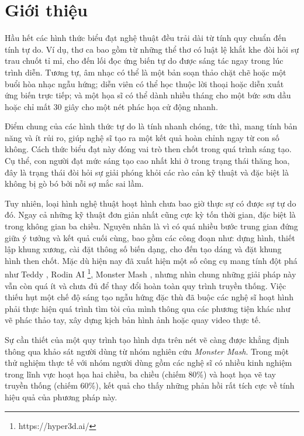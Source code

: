 \documentclass{report}
\begin{document}
\chapter{Giới thiệu}
Hầu hết các hình thức biểu đạt nghệ thuật đều trải dài từ tính quy chuẩn đến tính tự do. Ví dụ, thơ ca bao gồm từ những thể thơ có luật lệ khắt khe đòi hỏi sự trau chuốt tỉ mỉ, cho đến lối đọc ứng biến tự do được sáng tác ngay trong lúc trình diễn. Tương tự, âm nhạc có thể là một bản soạn thảo chặt chẽ hoặc một buổi hòa nhạc ngẫu hứng; diễn viên có thể học thuộc lời thoại hoặc diễn xuất ứng biến trực tiếp; và một họa sĩ có thể dành nhiều tháng cho một bức sơn dầu hoặc chỉ mất 30 giây cho một nét phác họa cử động nhanh.

Điểm chung của các hình thức tự do là tính nhanh chóng, tức thì, mang tính bản năng và ít rủi ro, giúp nghệ sĩ tạo ra một kết quả hoàn chỉnh ngay từ con số không. Cách thức biểu đạt này đóng vai trò then chốt trong quá trình sáng tạo. Cụ thể, con người đạt mức sáng tạo cao nhất khi ở trong trạng thái thăng hoa, đây là trạng thái đòi hỏi sự giải phóng khỏi các rào cản kỹ thuật và đặc biệt là không bị gò bó bởi nỗi sợ mắc sai lầm.

Tuy nhiên, loại hình nghệ thuật hoạt hình chưa bao giờ thực sự có được sự tự do đó. Ngay cả những kỹ thuật đơn giản nhất cũng cực kỳ tốn thời gian, đặc biệt là trong không gian ba chiều. Nguyên nhân là vì có quá nhiều bước trung gian đứng giữa ý tưởng và kết quả cuối cùng, bao gồm các công đoạn như: dựng hình, thiết lập khung xương, cài đặt thông số biến dạng, cho đến tạo dáng và đặt khung hình then chốt. Mặc dù hiện nay đã xuất hiện một số công cụ mang tính đột phá như Teddy \citep{teddy}, Rodin AI \footnote{https://hyper3d.ai/}, Monster Mash \citep{monstermash}, nhưng nhìn chung những giải pháp này vẫn còn quá ít và chưa đủ để thay đổi hoàn toàn quy trình truyền thống. Việc thiếu hụt một chế độ sáng tạo ngẫu hứng đặc thù đã buộc các nghệ sĩ hoạt hình phải thực hiện quá trình tìm tòi của mình thông qua các phương tiện khác như vẽ phác thảo tay, xây dựng kịch bản hình ảnh hoặc quay video thực tế.

Sự cần thiết của một quy trình tạo hình dựa trên nét vẽ càng được khẳng định thông qua khảo sát người dùng từ nhóm nghiên cứu \textit{Monster Mash}. Trong một thử nghiệm thực tế với nhóm người dùng gồm các nghệ sĩ có nhiều kinh nghiệm trong lĩnh vực hoạt họa hai chiều, ba chiều (chiếm 80\%) và hoạt họa vẽ tay truyền thống (chiếm 60\%), kết quả cho thấy những phản hồi rất tích cực về tính hiệu quả của phương pháp này.
\end{document}
